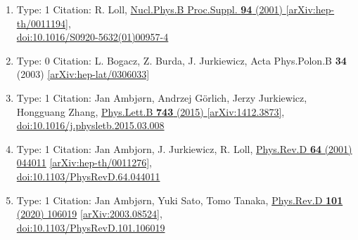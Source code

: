 \documentclass[a4paper,10pt]{article}
\begin{document}
\begin{enumerate}
\begin{enumerate}
  \item Type: 1 Citation: R. Loll, \href{https://www.doi.org/10.1016/S0920-5632(01)00957-4}{Nucl.Phys.B Proc.Suppl. {\bf 94} (2001) }  \href{https://arxiv.org/abs/hep-th/0011194}{[arXiv:hep-th/0011194]},\\\href{https://www.doi.org/10.1016/S0920-5632(01)00957-4}{doi:10.1016/S0920-5632(01)00957-4}
  \item Type: 0 Citation: L. Bogacz, Z. Burda, J. Jurkiewicz, Acta Phys.Polon.B {\bf 34} (2003)   \href{https://arxiv.org/abs/hep-lat/0306033}{[arXiv:hep-lat/0306033]}
  \item Type: 1 Citation: Jan Ambjørn, Andrzej Görlich, Jerzy Jurkiewicz, Hongguang Zhang, \href{https://www.doi.org/10.1016/j.physletb.2015.03.008}{Phys.Lett.B {\bf 743} (2015) }  \href{https://arxiv.org/abs/1412.3873}{[arXiv:1412.3873]},\\\href{https://www.doi.org/10.1016/j.physletb.2015.03.008}{doi:10.1016/j.physletb.2015.03.008}
  \item Type: 1 Citation: Jan Ambjorn, J. Jurkiewicz, R. Loll, \href{https://www.doi.org/10.1103/PhysRevD.64.044011}{Phys.Rev.D {\bf 64} (2001) 044011}  \href{https://arxiv.org/abs/hep-th/0011276}{[arXiv:hep-th/0011276]},\\\href{https://www.doi.org/10.1103/PhysRevD.64.044011}{doi:10.1103/PhysRevD.64.044011}
  \item Type: 1 Citation: Jan Ambjørn, Yuki Sato, Tomo Tanaka, \href{https://www.doi.org/10.1103/PhysRevD.101.106019}{Phys.Rev.D {\bf 101} (2020) 106019}  \href{https://arxiv.org/abs/2003.08524}{[arXiv:2003.08524]},\\\href{https://www.doi.org/10.1103/PhysRevD.101.106019}{doi:10.1103/PhysRevD.101.106019}

\end{enumerate}
\end{enumerate}
\end{document}
